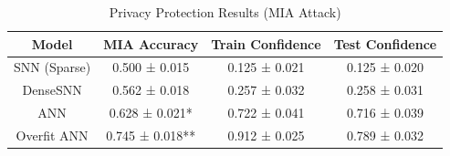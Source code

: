 \begin{table}[!t]
\centering
\caption{Privacy Protection Results (MIA Attack)}
\label{tab:privacy}
\begin{tabular}{c c c c}
\toprule
Model & MIA Accuracy & Train Confidence & Test Confidence \\
\midrule
SNN (Sparse) & 0.500 ± 0.015 & 0.125 ± 0.021 & 0.125 ± 0.020 \\
DenseSNN & 0.562 ± 0.018 & 0.257 ± 0.032 & 0.258 ± 0.031 \\
ANN & 0.628 ± 0.021* & 0.722 ± 0.041 & 0.716 ± 0.039 \\
Overfit ANN & 0.745 ± 0.018** & 0.912 ± 0.025 & 0.789 ± 0.032 \\
\bottomrule
\end{tabular}
\end{table}
